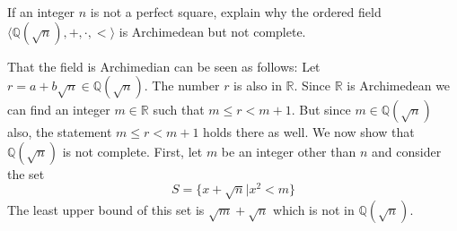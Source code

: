 \documentclass[answers]{exam}
\begin{document}
\begin{questions}
\question If an integer $n$ is not a perfect square, explain why the ordered field $\langle \mathbb{Q}(\sqrt{n}),+,\cdot,<\rangle$
is Archimedean but not complete.
\begin{solution}
    That the field is Archimedian can be seen as follows:  Let $r = a + b\sqrt{n} \in \mathbb{Q}(\sqrt{n})$.  The number $r$ is also
    in $\mathbb{R}$. Since $\mathbb{R}$ is Archimedean we can find an integer $m\in \mathbb{R}$ such that $m \leq r < m+1$. But since
    $m \in \mathbb{Q}(\sqrt{n})$ also, the statement $m \leq r < m+1$ holds there as well.
    We now show that $\mathbb{Q}(\sqrt{n})$ is not complete. First, let $m$ be an integer other than $n$ and consider the set
    \[ S = \{ x + \sqrt{n} | x^2 < m\} \]
    The least upper bound of this set is $\sqrt{m} + \sqrt{n}$ which is not in $\mathbb{Q}(\sqrt{n})$.
\end{solution}

\question 
{}
\end{questions}
\end{document}
